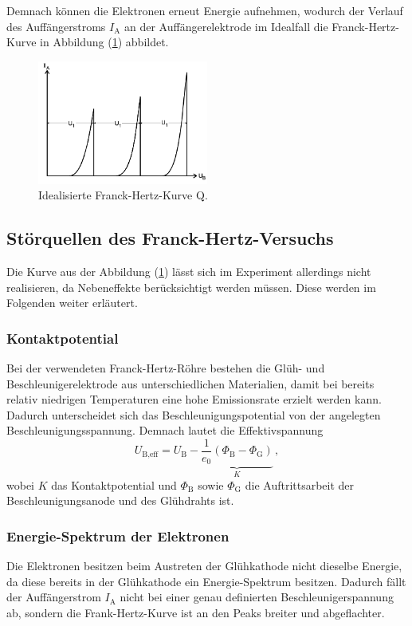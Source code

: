 Demnach können die Elektronen erneut Energie aufnehmen, wodurch der Verlauf des Auffängerstroms $I_{\text{A}}$ an der Auffängerelektrode im Idealfall die Franck-Hertz-Kurve
in Abbildung (\ref{fig:idealeKure}) abbildet.
\begin{figure}[h]
  \centering
  \includegraphics[width=0.5\textwidth]{content/Bilder/Ideale_Kurve.png}
  \caption{Idealisierte Franck-Hertz-Kurve Q\cite{anleitungV601}.}
  \label{fig:idealeKure}
\end{figure}
\subsection{Störquellen des Franck-Hertz-Versuchs}
\label{sec:Störquellen}
Die Kurve aus der Abbildung (\ref{fig:idealeKure}) lässt sich im Experiment allerdings nicht realisieren, da Nebeneffekte berücksichtigt werden müssen. Diese werden im Folgenden
weiter erläutert.
\subsubsection{Kontaktpotential}
Bei der verwendeten Franck-Hertz-Röhre bestehen die Glüh- und Beschleunigerelektrode aus unterschiedlichen Materialien, damit bei bereits relativ niedrigen Temperaturen
eine hohe Emissionsrate erzielt werden kann. Dadurch unterscheidet sich das Beschleunigungspotential von der angelegten Beschleunigungsspannung. Demnach lautet die Effektivspannung
\begin{equation}
  U_{\text{B,eff}} = U_{\text{B}} - \underbrace{\frac{1}{e_0}\left(\Phi _{\text{B}}-\Phi_{\text{G}}\right)}_{K}\,,
  \label{eqn:Effektivspannung}
\end{equation}
wobei $K$ das Kontaktpotential und $\Phi_{\text{B}}$ sowie $\Phi_{\text{G}}$ die Auftrittsarbeit der Beschleunigungsanode und des Glühdrahts ist.
\subsubsection{Energie-Spektrum der Elektronen}
Die Elektronen besitzen beim Austreten der Glühkathode nicht dieselbe Energie, da diese bereits in der Glühkathode ein Energie-Spektrum besitzen. Dadurch fällt der
Auffängerstrom $I_{\text{A}}$ nicht bei einer genau definierten Beschleunigerspannung ab, sondern die Frank-Hertz-Kurve ist an den Peaks breiter und abgeflachter.
